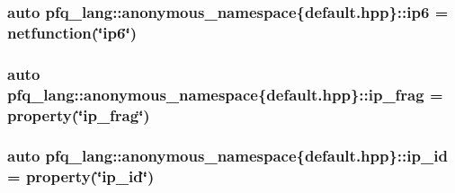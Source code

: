 \hypertarget{namespacepfq__lang_1_1anonymous__namespace_02default_8hpp_03_a566cbe8627dd2ae05071690ef64dbd12}{
\subsubsection[{ip6}]{\setlength{\rightskip}{0pt plus 5cm}auto pfq\+\_\+lang\+::anonymous\+\_\+namespace\{default.\+hpp\}\+::ip6 = {\bf netfunction}(\char`\"{}ip6\char`\"{})}}\label{namespacepfq__lang_1_1anonymous__namespace_02default_8hpp_03_a566cbe8627dd2ae05071690ef64dbd12}
\hypertarget{namespacepfq__lang_1_1anonymous__namespace_02default_8hpp_03_a29f207a5d209c3968f5d2e8f3c19c239}{
\subsubsection[{ip\+\_\+frag}]{\setlength{\rightskip}{0pt plus 5cm}auto pfq\+\_\+lang\+::anonymous\+\_\+namespace\{default.\+hpp\}\+::ip\+\_\+frag = {\bf property}(\char`\"{}ip\+\_\+frag\char`\"{})}}\label{namespacepfq__lang_1_1anonymous__namespace_02default_8hpp_03_a29f207a5d209c3968f5d2e8f3c19c239}
\hypertarget{namespacepfq__lang_1_1anonymous__namespace_02default_8hpp_03_a7e1fd2e2131451ca8afe2f8ab07b97a8}{
\subsubsection[{ip\+\_\+id}]{\setlength{\rightskip}{0pt plus 5cm}auto pfq\+\_\+lang\+::anonymous\+\_\+namespace\{default.\+hpp\}\+::ip\+\_\+id = {\bf property}(\char`\"{}ip\+\_\+id\char`\"{})}}\label{namespacepfq__lang_1_1anonymous__namespace_02default_8hpp_03_a7e1fd2e2131451ca8afe2f8ab07b97a8}
